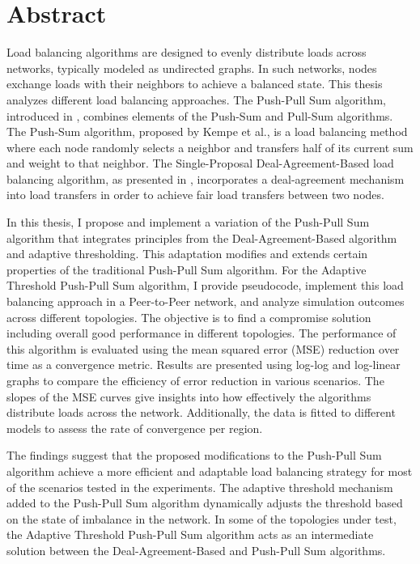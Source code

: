 \chapter*{Abstract}
Load balancing algorithms are designed to evenly distribute loads across networks, typically modeled as undirected graphs. In such networks, nodes exchange loads with their neighbors to achieve a balanced state. This thesis analyzes different load balancing approaches. The Push-Pull Sum algorithm, introduced in \cite{nugroho2023PushPullSumDataAg}, combines elements of the Push-Sum \cite{kempe2003gossipbasedComp} and Pull-Sum algorithms. The Push-Sum algorithm, proposed by Kempe et al., is a load balancing method where each node randomly selects a neighbor and transfers half of its current sum and weight to that neighbor. The Single-Proposal Deal-Agreement-Based load balancing algorithm, as presented in \cite{Dinitz2023DAB}, incorporates a deal-agreement mechanism into load transfers in order to achieve fair load transfers between two nodes.

In this thesis, I propose and implement a variation of the Push-Pull Sum algorithm that integrates principles from the Deal-Agreement-Based algorithm and adaptive thresholding. This adaptation modifies and extends certain properties of the traditional Push-Pull Sum algorithm. For the Adaptive Threshold Push-Pull Sum algorithm, I provide pseudocode, implement this load balancing approach in a Peer-to-Peer network, and analyze simulation outcomes across different topologies. The objective is to find a compromise solution including overall good performance in different topologies. The performance of this algorithm is evaluated using the mean squared error (MSE) reduction over time as a convergence metric. Results are presented using log-log and log-linear graphs to compare the efficiency of error reduction in various scenarios. The slopes of the MSE curves give insights into how effectively the algorithms distribute loads across the network. Additionally, the data is fitted to different models to assess the rate of convergence per region.

The findings suggest that the proposed modifications to the Push-Pull Sum algorithm achieve a more efficient and adaptable load balancing strategy for most of the scenarios tested in the experiments. The adaptive threshold mechanism added to the Push-Pull Sum algorithm dynamically adjusts the threshold based on the state of imbalance in the network. In some of the topologies under test, the Adaptive Threshold Push-Pull Sum algorithm acts as an intermediate solution between the Deal-Agreement-Based and Push-Pull Sum algorithms.